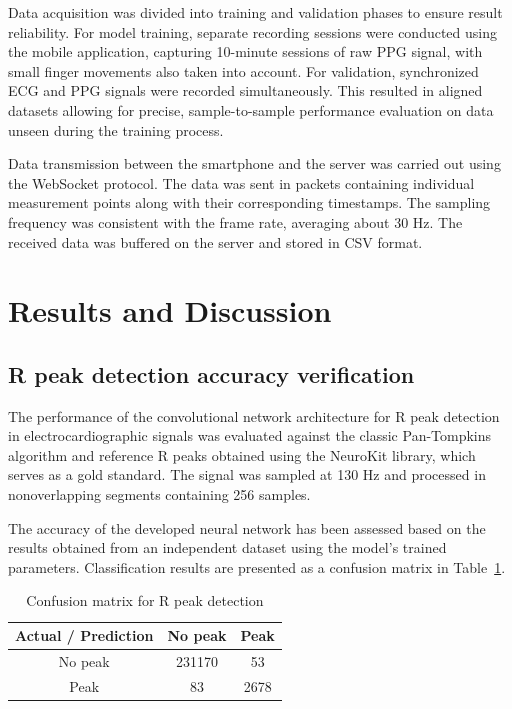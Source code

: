 \documentclass{citask}
\begin{document}
Data acquisition was divided into training and validation phases to ensure result reliability. For model training, separate recording sessions were conducted using the mobile application, capturing 10-minute sessions of raw PPG signal, with small finger movements also taken into account. For validation, synchronized ECG and PPG signals were recorded simultaneously. This resulted in aligned datasets allowing for precise, sample-to-sample performance evaluation on data unseen during the training process.

Data transmission between the smartphone and the server was carried out using the WebSocket protocol. The data was sent in packets containing individual measurement points along with their corresponding timestamps. The sampling frequency was consistent with the frame rate, averaging about 30 Hz. The received data was buffered on the server and stored in CSV format.

\section{Results and Discussion}

\subsection{R peak detection accuracy verification}
The performance of the convolutional network architecture for R peak detection in electrocardiographic signals was evaluated against the classic Pan-Tompkins algorithm and reference R peaks obtained using the NeuroKit library, which serves as a gold standard. The signal was sampled at 130 Hz and processed in nonoverlapping segments containing 256 samples.

The accuracy of the developed neural network has been assessed based on the results obtained from an independent dataset using the model's trained parameters. Classification results are presented as a confusion matrix in Table~\ref{tab:conf_matrix}.

\begin{table}[ht]
\centering
\caption{Confusion matrix for R peak detection}
\label{tab:conf_matrix}
\begin{tabular}{|c|c|c|}
\hline
\textbf{Actual / Prediction} & \textbf{No peak } & \textbf{Peak } \\
\hline
No peak  & 231170 & 53 \\
Peak  & 83 & 2678 \\
\hline
\end{tabular}
\end{table}
\end{document}
